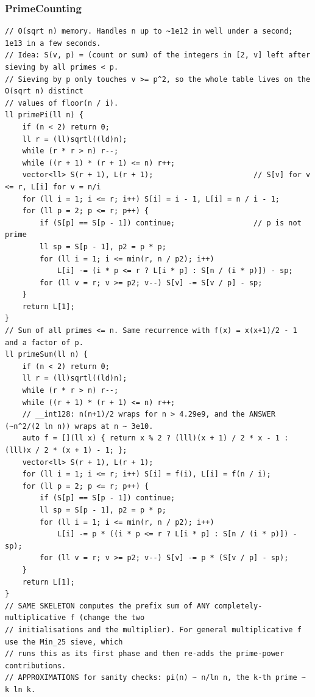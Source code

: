 \documentclass[9pt,a4paper,twocolumn]{extarticle}
\begin{document}
\filbreak
\subsubsection{PrimeCounting}
\nopagebreak
\begin{lstlisting}
// O(sqrt n) memory. Handles n up to ~1e12 in well under a second; 1e13 in a few seconds.
// Idea: S(v, p) = (count or sum) of the integers in [2, v] left after sieving by all primes < p.
// Sieving by p only touches v >= p^2, so the whole table lives on the O(sqrt n) distinct
// values of floor(n / i).
ll primePi(ll n) {
    if (n < 2) return 0;
    ll r = (ll)sqrtl((ld)n);
    while (r * r > n) r--;
    while ((r + 1) * (r + 1) <= n) r++;
    vector<ll> S(r + 1), L(r + 1);                       // S[v] for v <= r, L[i] for v = n/i
    for (ll i = 1; i <= r; i++) S[i] = i - 1, L[i] = n / i - 1;
    for (ll p = 2; p <= r; p++) {
        if (S[p] == S[p - 1]) continue;                  // p is not prime
        ll sp = S[p - 1], p2 = p * p;
        for (ll i = 1; i <= min(r, n / p2); i++)
            L[i] -= (i * p <= r ? L[i * p] : S[n / (i * p)]) - sp;
        for (ll v = r; v >= p2; v--) S[v] -= S[v / p] - sp;
    }
    return L[1];
}
// Sum of all primes <= n. Same recurrence with f(x) = x(x+1)/2 - 1 and a factor of p.
ll primeSum(ll n) {
    if (n < 2) return 0;
    ll r = (ll)sqrtl((ld)n);
    while (r * r > n) r--;
    while ((r + 1) * (r + 1) <= n) r++;
    // __int128: n(n+1)/2 wraps for n > 4.29e9, and the ANSWER (~n^2/(2 ln n)) wraps at n ~ 3e10.
    auto f = [](ll x) { return x % 2 ? (lll)(x + 1) / 2 * x - 1 : (lll)x / 2 * (x + 1) - 1; };
    vector<ll> S(r + 1), L(r + 1);
    for (ll i = 1; i <= r; i++) S[i] = f(i), L[i] = f(n / i);
    for (ll p = 2; p <= r; p++) {
        if (S[p] == S[p - 1]) continue;
        ll sp = S[p - 1], p2 = p * p;
        for (ll i = 1; i <= min(r, n / p2); i++)
            L[i] -= p * ((i * p <= r ? L[i * p] : S[n / (i * p)]) - sp);
        for (ll v = r; v >= p2; v--) S[v] -= p * (S[v / p] - sp);
    }
    return L[1];
}
// SAME SKELETON computes the prefix sum of ANY completely-multiplicative f (change the two
// initialisations and the multiplier). For general multiplicative f use the Min_25 sieve, which
// runs this as its first phase and then re-adds the prime-power contributions.
// APPROXIMATIONS for sanity checks: pi(n) ~ n/ln n, the k-th prime ~ k ln k.
\end{lstlisting}
\end{document}
